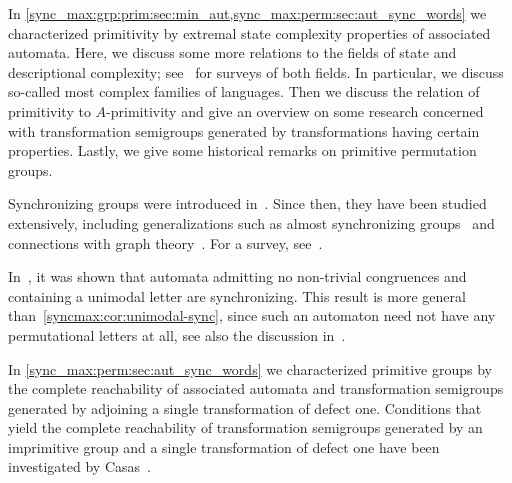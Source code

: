 
In \cref{sync_max:grp:prim:sec:min_aut,sync_max:perm:sec:aut_sync_words}
we characterized primitivity by extremal state complexity properties of associated automata.
Here, we discuss some more relations
to the fields of state and descriptional complexity;
see~\cite{GaoMRY17,HolzerK11} for surveys of both fields.
In particular, we discuss so-called most complex families of languages. 
Then we discuss the relation of primitivity
to $A$-primitivity
and give an overview on some research
concerned with transformation semigroups
generated by transformations
having certain properties. Lastly, we give some historical remarks on primitive permutation groups.

Synchronizing groups were introduced in~\cite{ArnoldS06}. Since then, they have been studied extensively, including generalizations such as almost synchronizing groups~\cite{DBLP:journals/tcs/AraujoBC13} and connections with graph theory~\cite{doi:10.1112/plms/pdw040,ArCamSt2017}. For a survey, see~\cite{ArCamSt2017}.

In~\cite{Volkov24}, it was shown that automata admitting no non-trivial congruences and containing a unimodal letter are synchronizing. This result is more general than~\cref{syncmax:cor:unimodal-sync}, since such an automaton need not have any permutational letters at all, see also the discussion in~\cite{Volkov24}.

In \cref{sync_max:perm:sec:aut_sync_words} we characterized primitive groups by
the complete reachability of associated automata and transformation semigroups
generated by adjoining a single transformation of defect one.
Conditions that yield the complete reachability 
of transformation semigroups generated by
an imprimitive group and a single transformation of defect one have been investigated by Casas~\cite{CasasTorres2024CompletelyReachable}.

